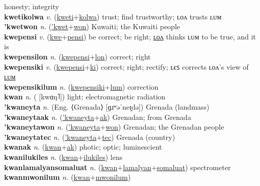 honesty; integrity \label{kwetilyan} \\
\textbf{kwetikolwa} \textit{v.} (\hyperref[kweti]{kweti}+\hyperref[kolwa]{kolwa})
trust; find trustworthy; ʟᴏᴧ trusts ʟᴜᴍ \label{kwetikolwa} \\
\textbf{'kwetwon} \textit{n.} (\hyperref['kwet]{'kwet}+\hyperref[won]{won})
Kuwaiti; the Kuwaiti people \label{'kwetwon} \\
\textbf{kwepensi} \textit{v.} (\hyperref[kwe]{kwe}+\hyperref[pensi]{pensi})
be correct; be right; \hyperref[kwepensilon]{ʟᴏᴧ} thinks ʟᴜᴍ to be true, and it is \label{kwepensi} \\
\textbf{kwepensilon} \textit{n.} (\hyperref[kwepensi]{kwepensi}+\hyperref[lon]{lon})
correct; right \label{kwepensilon} \\
\textbf{kwepensiki} \textit{v.} (\hyperref[kwepensi]{kwepensi}+\hyperref[ki]{ki})
correct; right; rectify; ʟєꜱ corrects ʟᴏᴧ’s view of \hyperref[kwepensikilum]{ʟᴜᴍ} \label{kwepensiki} \\
\textbf{kwepensikilum} \textit{n.} (\hyperref[kwepensiki]{kwepensiki}+\hyperref[lum]{lum})
correction \label{kwepensikilum} \\
\textbf{kwan} \textit{n.} ( [kwɑŋ˥])
light; electromagnetic radiation \label{kwan} \\
\textbf{'kwaneyta} \textit{n.} (Eng. ⟨Grenada⟩ [ɡɹʷəˈneɪ̯də])
Grenada (landmass) \label{'kwaneyta} \\
\textbf{'kwaneytaak} \textit{n.} (\hyperref['kwaneyta]{'kwaneyta}+\hyperref[ak]{ak})
Grenadan; from Grenada \label{'kwaneytaak} \\
\textbf{'kwaneytawon} \textit{n.} (\hyperref['kwaneyta]{'kwaneyta}+\hyperref[won]{won})
Grenadan; the Grenadan people \label{'kwaneytawon} \\
\textbf{'kwaneytatec} \textit{n.} (\hyperref['kwaneyta]{'kwaneyta}+\hyperref[tec]{tec})
Grenada (country) \label{'kwaneytatec} \\
\textbf{kwanak} \textit{n.} (\hyperref[kwan]{kwan}+\hyperref[ak]{ak})
photic; optic; luminescient \label{kwanak} \\
\textbf{kwanilukiles} \textit{n.} (\hyperref[kwan]{kwan}+\hyperref[ilukiles]{ilukiles})
lens \label{kwanilukiles} \\
\textbf{kwanlamalyansomaluat} \textit{n.} (\hyperref[kwan]{kwan}+\hyperref[lamalyan]{lamalyan}+\hyperref[somaluat]{somaluat})
spectrometer \label{kwanlamalyansomaluat} \\
\textbf{kwanmwonilum} \textit{n.} (\hyperref[kwan]{kwan}+\hyperref[mwonilum]{mwonilum})
